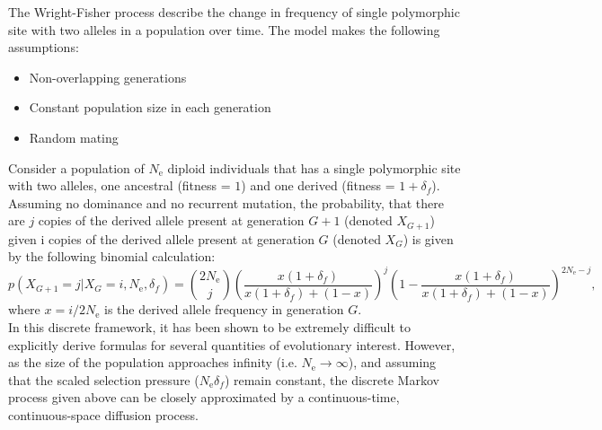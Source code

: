 \documentclass{article}
\newcommand{\e}{\mathrm{e}}
\newcommand{\Ne}{N_\e}
\newcommand{\fit}{f}
\newcommand{\selcoef}{{\delta_{\fit}}}
\begin{document}
The Wright-Fisher process describe the change in frequency of single polymorphic site with two alleles in a population over time.
The model makes the following assumptions:
\begin{itemize}
	\setlength\itemsep{-0.2em}
	\item Non-overlapping generations
	\item Constant population size in each generation
	\item Random mating
\end{itemize}
Consider a population of $\Ne$ diploid individuals that has a single polymorphic site with two alleles, one ancestral (fitness = $1$) and one derived (fitness = $1+\selcoef$).
Assuming no dominance and no recurrent mutation, the probability, that there are $j$ copies of the derived allele present at generation $G+1$ (denoted $X_{G+1}$) given i copies of the derived allele present at generation $G$ (denoted $X_{G}$) is given by the following binomial calculation:
\begin{equation}
	p\left( X_{G+1} = j |X_{G} = i, \Ne, \selcoef \right)  =  \binom{2 \Ne}{j} \left( \dfrac{x(1+\selcoef)}{x(1+\selcoef) + (1-x)} \right)^j \left(1 - \dfrac{x(1+\selcoef)}{x(1+\selcoef) + (1-x)} \right)^{2 \Ne -j}, 
\end{equation}
where $x = i / 2 \Ne$ is the derived allele frequency in generation $G$.\\

In this discrete framework, it has been shown to be extremely difficult to explicitly derive formulas for several quantities of evolutionary interest.
However, as the size of the population approaches infinity (i.e.
$ \Ne \rightarrow \infty$), and assuming that the scaled selection pressure ($\Ne \selcoef $) remain constant, the discrete Markov process given above can be closely approximated by a continuous-time, continuous-space diffusion process.\\
\end{document}
